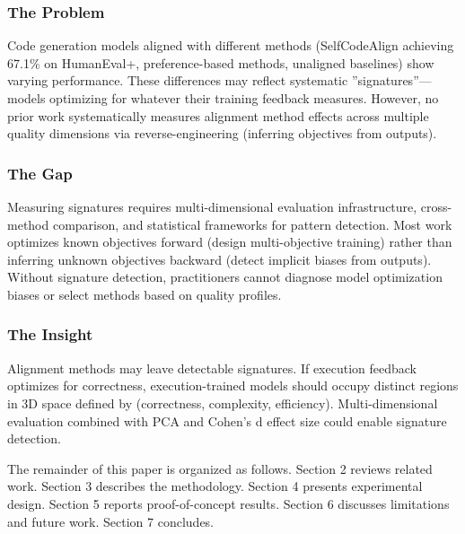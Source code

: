 \subsubsection{The Problem}

Code generation models aligned with different methods (SelfCodeAlign achieving 67.1\% on HumanEval+, preference-based methods, unaligned baselines) show varying performance. These differences may reflect systematic ''signatures''---models optimizing for whatever their training feedback measures. However, no prior work systematically measures alignment method effects across multiple quality dimensions via reverse-engineering (inferring objectives from outputs).

\subsubsection{The Gap}

Measuring signatures requires multi-dimensional evaluation infrastructure, cross-method comparison, and statistical frameworks for pattern detection. Most work optimizes known objectives forward (design multi-objective training) rather than inferring unknown objectives backward (detect implicit biases from outputs). Without signature detection, practitioners cannot diagnose model optimization biases or select methods based on quality profiles.

\subsubsection{The Insight}

Alignment methods may leave detectable signatures. If execution feedback optimizes for correctness, execution-trained models should occupy distinct regions in 3D space defined by (correctness, complexity, efficiency). Multi-dimensional evaluation combined with PCA and Cohen's d effect size could enable signature detection.

The remainder of this paper is organized as follows. Section 2 reviews related work. Section 3 describes the methodology. Section 4 presents experimental design. Section 5 reports proof-of-concept results. Section 6 discusses limitations and future work. Section 7 concludes.
